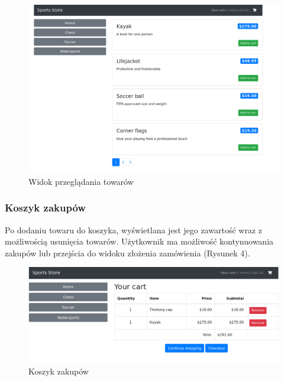 \documentclass[a4paper,10pt]{article}
\begin{document}
\begin{figure}
 \centering
 \includegraphics[width=\linewidth]{Images/productsList.png}
 \caption{Widok przeglądania towarów}
 \label{rys:}
\end{figure}
\subsubsection{Koszyk zakupów}
Po dodaniu towaru do koszyka, wyświetlana jest jego zawartość wraz z możliwością usunięcia towarów. Użytkownik ma możliwość kontynuowania zakupów lub przejścia do widoku złożenia zamówienia (Rysunek 4).

\begin{figure}
 \centering
 \includegraphics[width=\linewidth]{Images/cart.png}
 \caption{Koszyk zakupów}
 \label{rys:}
\end{figure}
\end{document}
